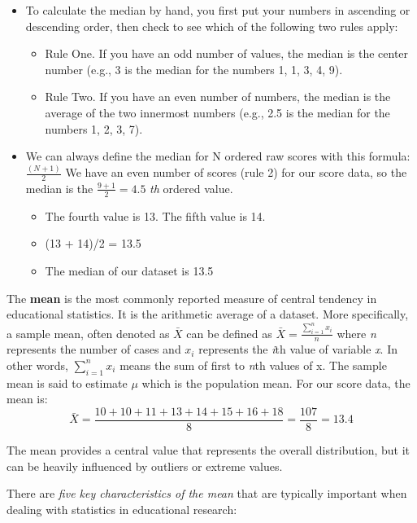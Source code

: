 \documentclass[
  letterpaper,
  DIV=11,
  numbers=noendperiod]{scrreprt}
\begin{document}
\begin{itemize}
\item
  To calculate the median by hand, you first put your numbers in
  ascending or descending order, then check to see which of the
  following two rules apply:

  \begin{itemize}
  \item
    Rule One. If you have an odd number of values, the median is the
    center number (e.g., 3 is the median for the numbers 1, 1, 3, 4, 9).
  \item
    Rule Two. If you have an even number of numbers, the median is the
    average of the two innermost numbers (e.g., 2.5 is the median for
    the numbers 1, 2, 3, 7).
  \end{itemize}
\item
  We can always define the median for N ordered raw scores with this
  formula: \(\frac{(N + 1)}{2}\) We have an even number of scores (rule
  2) for our score data, so the median is the \(\frac{9 + 1}{2} = 4.5\)
  \emph{th} ordered value.

  \begin{itemize}
  \item
    The fourth value is 13. The fifth value is 14.
  \item
    (13 + 14)/2 = 13.5
  \item
    The median of our dataset is 13.5
  \end{itemize}
\end{itemize}

The \textbf{mean} is the most commonly reported measure of central
tendency in educational statistics. It is the arithmetic average of a
dataset. More specifically, a sample mean, often denoted as \(\bar{X}\)
can be defined as \(\bar{X} = \frac{\sum_{i=1}^{n} x_i}{n}\) where
\emph{n} represents the number of cases and \(x_i\) represents the
\emph{i}th value of variable \emph{x}. In other words,
\(\sum_{i=1}^{n} x_i\) means the sum of first to \emph{n}th values of x.
The sample mean is said to estimate \(\mu\) which is the population
mean. For our score data, the mean is: \[
\bar{X} = \frac{10 + 10 + 11 + 13 + 14 + 15 + 16 + 18}{8}
= \frac{107}{8}
= 13.4
\]

The mean provides a central value that represents the overall
distribution, but it can be heavily influenced by outliers or extreme
values.

There are \emph{five key characteristics of the mean} that are typically
important when dealing with statistics in educational research:
\end{document}
